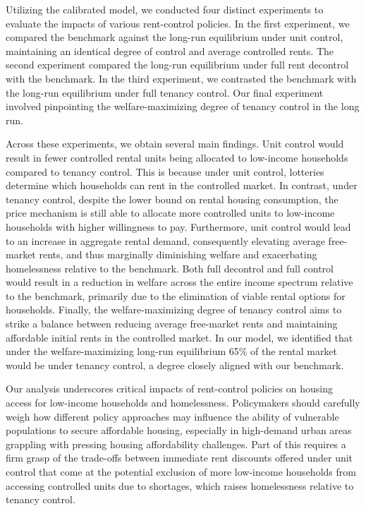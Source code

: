 \documentclass[parskip=full]{article}
\begin{document}
Utilizing the calibrated model, we conducted four distinct experiments to evaluate the impacts of various rent-control policies. In the first experiment, we compared the benchmark against the long-run equilibrium under unit control, maintaining an identical degree of control and average controlled rents. The second experiment compared the long-run equilibrium under full rent decontrol with the benchmark. In the third experiment, we contrasted the benchmark with the long-run equilibrium under full tenancy control. Our final experiment involved pinpointing the welfare-maximizing degree of tenancy control in the long run.

Across these experiments, we obtain several main findings. Unit control would result in fewer controlled rental units being allocated to low-income households compared to tenancy control. This is because under unit control, lotteries determine which households can rent in the controlled market. In contrast, under tenancy control, despite the lower bound on rental housing consumption, the price mechanism is still able to allocate more controlled units to low-income households with higher willingness to pay. Furthermore, unit control would lead to an increase in aggregate rental demand, consequently elevating average free-market rents, and thus marginally diminishing welfare and exacerbating homelessness relative to the benchmark. Both full decontrol and full control would result in a reduction in welfare across the entire income spectrum relative to the benchmark, primarily due to the elimination of viable rental options for households. Finally, the welfare-maximizing degree of tenancy control aims to strike a balance between reducing average free-market rents and maintaining affordable initial rents in the controlled market. In our model, we identified that under the welfare-maximizing long-run equilibrium 65\% of the rental market would be under tenancy control, a degree closely aligned with our benchmark.

Our analysis underscores critical impacts of rent-control policies on housing access for low-income households and homelessness. Policymakers should carefully weigh how different policy approaches may influence the ability of vulnerable populations to secure affordable housing, especially in high-demand urban areas grappling with pressing housing affordability challenges. Part of this requires a firm grasp of the trade-offs between immediate rent discounts offered under unit control that come at the potential exclusion of more low-income households from accessing controlled units due to shortages, which raises homelessness relative to tenancy control.
\end{document}
